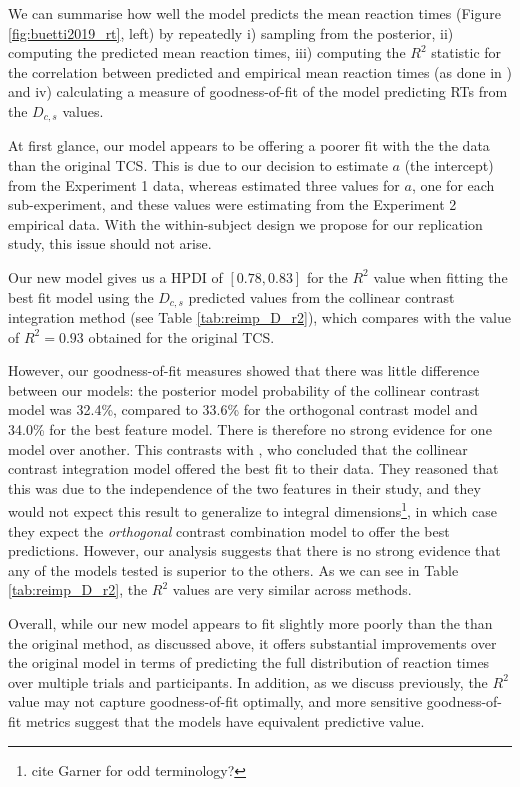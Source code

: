 \documentclass[smallextended, natbib]{svjour3}       %
\begin{document}
We can summarise how well the model predicts the mean reaction times (Figure \ref{fig:buetti2019_rt}, left) by repeatedly i) sampling from the posterior, ii) computing the predicted mean reaction times, iii) computing the $R^2$ statistic for the correlation between predicted and empirical mean reaction times (as done in \cite{buetti2019predicting}) and iv) calculating a measure of goodness-of-fit of the model predicting RTs from the $D_{c,s}$ values.

At first glance, our model appears to be offering a poorer fit with the the data than the original TCS. This is due to our decision to estimate $a$ (the intercept) from the Experiment 1 data, whereas \cite{buetti2019predicting} estimated three values for $a$, one for each sub-experiment, and these values were estimating from the Experiment 2 empirical data. With the within-subject design we propose for our replication study, this issue should not arise.

Our new model gives us a HPDI of $[0.78, 0.83]$ for the $R^2$ value when fitting the best fit model using the $D_{c,s}$ predicted values from the collinear contrast integration method (see Table \ref{tab:reimp_D_r2}), which compares with the value of $R^2 = 0.93$ obtained for the original TCS.  

However, our goodness-of-fit measures showed that there was little difference between our models: the posterior model probability of the collinear contrast model was 32.4\%, compared to 33.6\% for the orthogonal contrast model and 34.0\% for the best feature model. There is therefore no strong evidence for one model over another. This contrasts with \cite{buetti2019predicting}, who concluded that the collinear contrast integration model offered the best fit to their data. They reasoned that this was due to the independence of the two features in their study, and they would not expect this result to generalize to integral dimensions\footnote{cite Garner for odd terminology?}, in which case they expect the \textit{orthogonal} contrast combination model to offer the best predictions. However, our analysis suggests that there is no strong evidence that any of the models tested is superior to the others. As we can see in Table \ref{tab:reimp_D_r2}, the $R^2$ values are very similar across methods. 

Overall, while our new model appears to fit slightly more poorly than the than the original method, as discussed above, it offers substantial improvements over the original model in terms of predicting the full distribution of reaction times over multiple trials and participants. In addition, as we discuss previously, the $R^2$ value may not capture goodness-of-fit optimally, and more sensitive goodness-of-fit metrics suggest that the models have equivalent predictive value.
\end{document}
